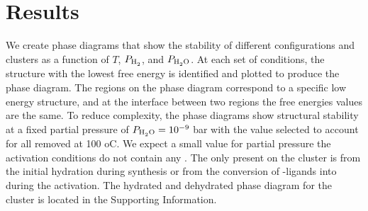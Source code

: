 \documentclass[journal=jctcce,manuscript=article]{achemso}
\begin{document}
\newpage

\section{Results}
We create phase diagrams that show the stability of different configurations and clusters as a function of $T$, $P_{\text{\ce{H2}}}$, and $P_{\text{\ce{H2O}}}$. At each set of conditions, the structure with the lowest free energy is identified and plotted to produce the phase diagram. The regions on the phase diagram correspond to a specific low energy structure, and at the interface between two regions the free energies values are the same. To reduce complexity, the phase diagrams show structural stability at a fixed partial pressure of $P_{\text{\ce{H2O}}} = 10^{-9}$ bar with the value selected to account for all  removed at 100 oC. We expect a small value for  partial pressure the activation conditions do not contain any . The only  present on the cluster is from the initial hydration during synthesis or from the conversion of -ligands into  during the activation. The hydrated and dehydrated phase diagram for the  cluster is located in the Supporting Information. 

%    
%    
\end{document}
